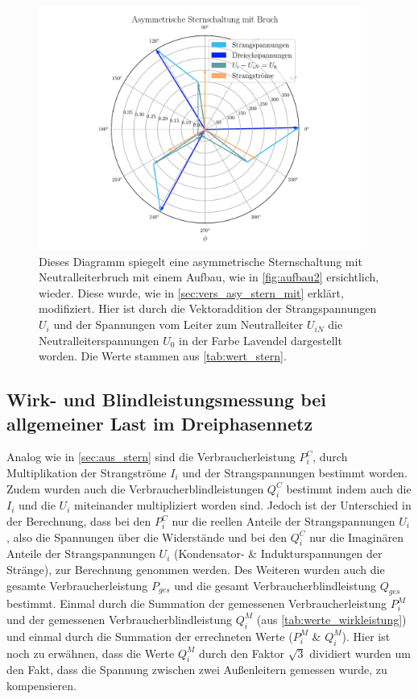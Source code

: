 \documentclass[12pt,english,ngerman]{scrartcl}
\begin{document}
\begin{figure}[H]
	\begin{center}
		\includegraphics[width = 0.95\textwidth]{figures/zeigerSternAsymBruch.pdf}
	\end{center}
	\caption[Zeigerdiagramm einer asymmetrisch ohmsch-belastete Sternschaltung mit
		Neutralleiterbruch]{Dieses Diagramm spiegelt eine asymmetrische Sternschaltung
		mit Neutralleiterbruch mit einem Aufbau, wie in \autoref{fig:aufbau2}
		ersichtlich, wieder. Diese wurde, wie in \autoref{sec:vers_asy_stern_mit}
		erklärt, modifiziert. Hier ist durch die Vektoraddition der Strangspannungen
		$U_i$ und der Spannungen vom Leiter zum Neutralleiter $U_{iN}$ die
		Neutralleiterspannungen $U_0$ in der Farbe Lavendel dargestellt worden. Die
		Werte stammen aus \autoref{tab:wert_stern}.
	}\label{fig:zeigerSternAsymBruch}
\end{figure}

\subsection{Wirk- und Blindleistungsmessung bei allgemeiner Last im Dreiphasennetz}

Analog wie in \autoref{sec:aus_stern} sind die Verbraucherleistung $P_i^C$,
durch Multiplikation der Strangströme $I_i$ und der Strangspannungen bestimmt
worden. Zudem wurden auch die Verbraucherblindleistungen $Q_i^C$ bestimmt indem
auch die $I_i$ und die $U_i$ miteinander multipliziert worden sind. Jedoch ist
der Unterschied in der Berechnung, dass bei den $P_i^C$ nur die reellen Anteile
der Strangspannungen $U_i$, also die Spannungen über die Widerstände und bei
den $Q_i^C$ nur die Imaginären Anteile der Strangspannungen $U_i$ (Kondensator-
\& Indukturspannungen der Stränge), zur Berechnung genommen werden. Des
Weiteren wurden auch die gesamte Verbraucherleistung $P_{ges}$ und die gesamt
Verbraucherblindleistung $Q_{ges}$ bestimmt. Einmal durch die Summation der
gemessenen Verbraucherleistung $P_i^M$ und der gemessenen
Verbraucherblindleistung $Q_i^M$ (aus \autoref{tab:werte_wirkleistung}) und
einmal durch die Summation der errechneten Werte ($P_i^M$ \& $Q_i^M$). Hier ist
noch zu erwähnen, dass die Werte $Q_i^M$ durch den Faktor $\sqrt{3}$ dividiert
wurden um den Fakt, dass die Spannung zwischen zwei Außenleitern gemessen
wurde, zu kompensieren.
\end{document}
